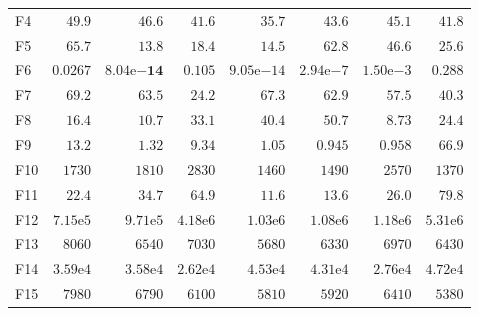 \begin{tabular}{lrrrrrrr}
F4 & $49.9$ & $46.6$ & $41.6$ & $35.7$ & $43.6$ & $45.1$ & $41.8$ \\
F5 & $65.7$ & $13.8$ & $18.4$ & $14.5$ & $62.8$ & $46.6$ & $25.6$ \\
F6 & $0.0267$ & $\mathbf{8.04\mathrm{e}{-14}}$ & $0.105$ & $9.05\mathrm{e}{-14}$ & $2.94\mathrm{e}{-7}$ & $1.50\mathrm{e}{-3}$ & $0.288$ \\
F7 & $69.2$ & $63.5$ & $24.2$ & $67.3$ & $62.9$ & $57.5$ & $40.3$ \\
F8 & $16.4$ & $10.7$ & $33.1$ & $40.4$ & $50.7$ & $8.73$ & $24.4$ \\
F9 & $13.2$ & $1.32$ & $9.34$ & $1.05$ & $0.945$ & $0.958$ & $66.9$ \\
F10 & $1730$ & $1810$ & $2830$ & $1460$ & $1490$ & $2570$ & $1370$ \\
F11 & $22.4$ & $34.7$ & $64.9$ & $11.6$ & $13.6$ & $26.0$ & $79.8$ \\
F12 & $7.15\mathrm{e}{5}$ & $9.71\mathrm{e}{5}$ & $4.18\mathrm{e}{6}$ & $1.03\mathrm{e}{6}$ & $1.08\mathrm{e}{6}$ & $1.18\mathrm{e}{6}$ & $5.31\mathrm{e}{6}$ \\
F13 & $8060$ & $6540$ & $7030$ & $5680$ & $6330$ & $6970$ & $6430$ \\
F14 & $3.59\mathrm{e}{4}$ & $3.58\mathrm{e}{4}$ & $2.62\mathrm{e}{4}$ & $4.53\mathrm{e}{4}$ & $4.31\mathrm{e}{4}$ & $2.76\mathrm{e}{4}$ & $4.72\mathrm{e}{4}$ \\
F15 & $7980$ & $6790$ & $6100$ & $5810$ & $5920$ & $6410$ & $5380$ \\
\bottomrule
\end{tabular}
